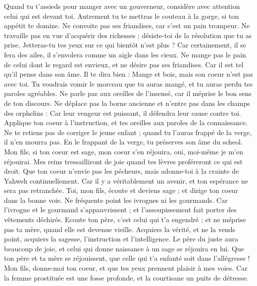 \begin{multicols}{2}
\VerseOne{}Quand tu t’assieds pour manger avec un gouverneur, considère avec attention celui qui est devant toi.
Autrement tu te mettras le couteau à la gorge, si ton appétit te domine.
Ne convoite pas ses friandises, car c'est un pain trompeur.
Ne travaille pas en vue d’acquérir des richesses ; désiste-toi de la résolution que tu as prise.
Jetteras-tu tes yeux sur ce qui bientôt n'est plus ? Car certainement, il se fera des ailes, il s'envolera comme un aigle dans les cieux.
Ne mange pas le pain de celui dont le regard est envieux, et ne désire pas ses friandises.
Car il est tel qu'il pense dans son âme. Il te dira bien : Mange et bois, mais son coeur n'est pas avec toi.
Tu voudrais vomir le morceau que tu auras mangé, et tu auras perdu tes paroles agréables.
Ne parle pas aux oreilles de l’insensé, car il méprise le bon sens de ton discours.
Ne déplace pas la borne ancienne et n'entre pas dans les champs des orphelins :
Car leur vengeur est puissant, il défendra leur cause contre toi.
Applique ton coeur à l'instruction, et tes oreilles aux paroles de la connaissance.
Ne te retiens pas de corriger le jeune enfant ; quand tu l'auras frappé de la verge, il n'en mourra pas.
En le frappant de la verge, tu préserves son âme du scheol.
Mon fils, si ton coeur est sage, mon coeur s'en réjouira, oui, moi-même je m’en réjouirai.
Mes reins tressailliront de joie quand tes lèvres proféreront ce qui est droit.
Que ton coeur n'envie pas les pécheurs, mais adonne-toi à la crainte de Yahweh continuellement.
Car il y a véritablement un avenir, et ton espérance ne sera pas retranchée.
Toi, mon fils, écoute et deviens sage ; et dirige ton coeur dans la bonne voie.
Ne fréquente point les ivrognes ni les gourmands.
Car l'ivrogne et le gourmand s’appauvrissent ; et l’assoupissement fait porter des vêtements déchirés.
Ecoute ton père, c’est celui qui t'a engendré ; et ne méprise pas ta mère, quand elle est devenue vieille.
Acquiers la vérité, et ne la vends point, acquiers la sagesse, l'instruction et l’intelligence.
Le père du juste aura beaucoup de joie, et celui qui donne naissance à un sage se réjouira en lui.
Que ton père et ta mère se réjouissent, que celle qui t'a enfanté soit dans l’allégresse !
Mon fils, donne-moi ton coeur, et que tes yeux prennent plaisir à mes voies.
Car la femme prostituée est une fosse profonde, et la courtisane un puits de détresse.

\end{multicols}
